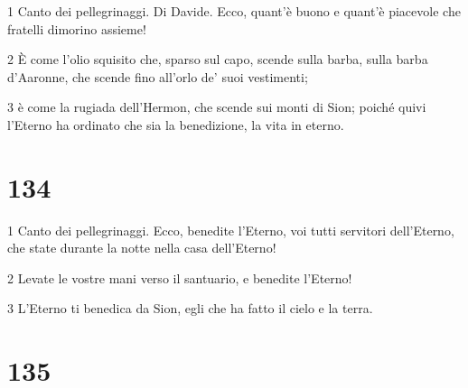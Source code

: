 \par 1 Canto dei pellegrinaggi. Di Davide. Ecco, quant'è buono e quant'è piacevole che fratelli dimorino assieme!
\par 2 È come l'olio squisito che, sparso sul capo, scende sulla barba, sulla barba d'Aaronne, che scende fino all'orlo de' suoi vestimenti;
\par 3 è come la rugiada dell'Hermon, che scende sui monti di Sion; poiché quivi l'Eterno ha ordinato che sia la benedizione, la vita in eterno.

\chapter{134}

\par 1 Canto dei pellegrinaggi. Ecco, benedite l'Eterno, voi tutti servitori dell'Eterno, che state durante la notte nella casa dell'Eterno!
\par 2 Levate le vostre mani verso il santuario, e benedite l'Eterno!
\par 3 L'Eterno ti benedica da Sion, egli che ha fatto il cielo e la terra.

\chapter{135}

